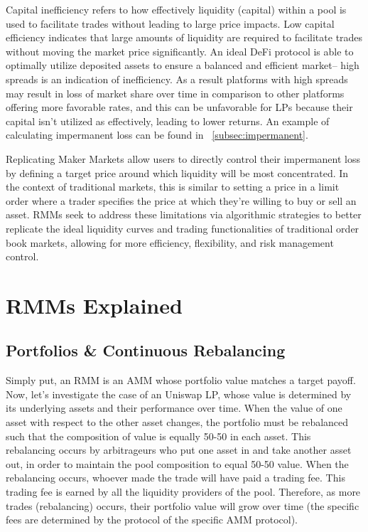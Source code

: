 \documentclass[12pt]{article}
\begin{document}
Capital inefficiency refers to how effectively liquidity (capital) within a pool is used to facilitate trades without leading to large price impacts. Low capital efficiency indicates that large amounts of liquidity are required to facilitate trades without moving the market price significantly. An ideal DeFi protocol is able to optimally utilize deposited assets to ensure a balanced and efficient market– high spreads is an indication of inefficiency. As a result platforms with high spreads may result in loss of market share over time in comparison to other platforms offering more favorable rates, and this can be unfavorable for LPs because their capital isn't utilized as effectively, leading to lower returns. An example of calculating impermanent loss can be found in ~\ref{subsec:impermanent}.\

Replicating Maker Markets allow users to directly control their impermanent loss by defining a target price around which liquidity will be most concentrated. In the context of traditional markets, this is similar to setting a price in a limit order where a trader specifies the price at which they're willing to buy or sell an asset. RMMs seek to address these limitations via algorithmic strategies to better replicate the ideal liquidity curves and trading functionalities of traditional order book markets, allowing for more efficiency, flexibility, and risk management control.

\section{RMMs Explained}
\subsection{Portfolios \& Continuous Rebalancing}
Simply put, an RMM is an AMM whose portfolio value matches a target payoff. Now, let’s investigate the case of an Uniswap LP, whose value is determined by its underlying assets and their performance over time. When the value of one asset with respect to the other asset changes, the portfolio must be rebalanced such that the composition of value is equally 50-50 in each asset. This rebalancing occurs by arbitrageurs who put one asset in and take another asset out, in order to maintain the pool composition to equal 50-50 value. When the rebalancing occurs, whoever made the trade will have paid a trading fee. This trading fee is earned by all the liquidity providers of the pool. Therefore, as more trades (rebalancing) occurs, their portfolio value will grow over time (the specific fees are determined by the protocol of the specific AMM protocol).
\end{document}

